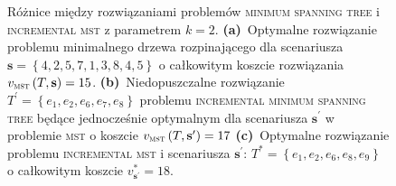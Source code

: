 \begin{figure}[!htbp]
\begin{subfigure}[b]{0.3\textwidth}
		\caption{}
		\label{fig:increxample:c}
	\end{subfigure}
	\hfill\null
	\caption{
		Różnice między rozwiązaniami problemów \textsc{minimum spanning tree} i \textsc{incremental mst} z parametrem $k = 2$.
		\textbf{(a)}~Optymalne rozwiązanie problemu minimalnego drzewa rozpinającego dla scenariusza $\textbf{s} = \left\{ 4, 2, 5, 7, 1, 3, 8, 4, 5 \right\}$ o całkowitym koszcie rozwiązania $v_{\textsc{mst}} \left( T, \textbf{s} \right) = 15$.	
		\textbf{(b)}~Niedopuszczalne rozwiązanie $T^{\prime} = \left\{ e_{1}, e_{2}, e_{6}, e_{7}, e_{8} \right\}$ problemu \textsc{incremental minimum spanning tree} będące jednocześnie optymalnym dla scenariusza $\textbf{s}^{\prime}$ w problemie \textsc{mst} o koszcie $v_{\textsc{mst}} \left( T, \textbf{s}^{\prime} \right) = 17$
		\textbf{(c)}~Optymalne rozwiązanie problemu \textsc{incremental mst} i scenariusza $\textbf{s}^{\prime}$: $T^{\ast} = \left\{ e_{1}, e_{2}, e_{6}, e_{8}, e_{9} \right\}$ o całkowitym koszcie $v^{\ast}_{\textbf{s}^{\prime}} = 18$.
	}
	\label{fig:increxample}
\end{figure}
